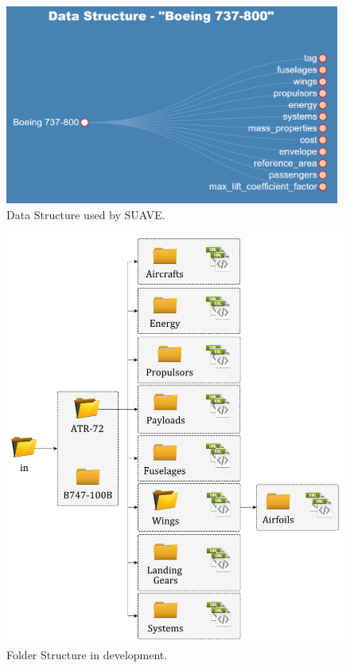 \begin{figure}[H]
\centering
	\includegraphics[width=11cm]{Immagini/suave/flowchartBoeing1}
	\caption{Data Structure used by SUAVE.}
	\label{fig:suave1}
\end{figure}

%



\begin{figure}[H]
\centering
	\includegraphics[width=11 cm]{Immagini/suave/Folder_Tree}
		\caption{Folder Structure in development.}
		\label{fig:suave3}
\end{figure}

